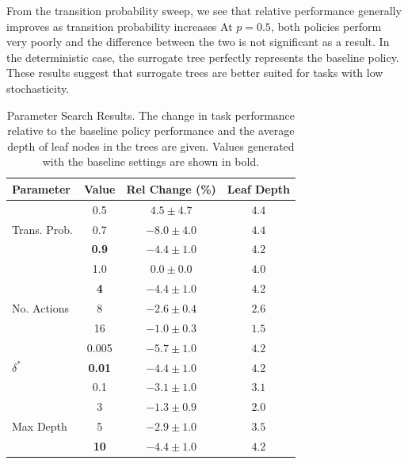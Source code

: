 \documentclass[letterpaper]{article} %
\begin{document}
From the transition probability sweep, we see that relative performance generally improves as transition probability increases
At $p=0.5$, both policies perform very poorly and the difference between the two is not significant as a result.
In the deterministic case, the surrogate tree perfectly represents the baseline policy.
These results suggest that surrogate trees are better suited for tasks with low stochasticity.
\begin{table}[t]
    \centering
    \begin{tabular}{@{}l c c c@{}}
        \toprule
        Parameter & Value & Rel Change (\%) & Leaf Depth \\
        \midrule
        \multirow[c]{3}{*}{Trans. Prob.} & 0.5 & $4.5 \pm 4.7$ & $4.4$ \\
        & 0.7 & $-8.0 \pm 4.0$ & $4.4$ \\
        & \textbf{0.9} & $\mathbf{-4.4 \pm 1.0}$ & $\mathbf{4.2}$ \\
        & 1.0 & $0.0 \pm 0.0$ & $4.0$ \\
        \midrule
        \multirow[c]{3}{*}{No. Actions} & \textbf{4} & $\mathbf{-4.4 \pm 1.0}$ & $\mathbf{4.2}$ \\
        & 8 & $-2.6 \pm 0.4$ & $2.6$ \\
        & 16 & $-1.0 \pm 0.3$ & $1.5$ \\
        \midrule
        \multirow[c]{3}{*}{$\delta^*$} & 0.005 & $-5.7 \pm 1.0$ & $4.2$ \\
        & \textbf{0.01} & $\mathbf{-4.4 \pm 1.0}$ & $\mathbf{4.2}$ \\
        & 0.1 & $-3.1 \pm 1.0$ & $3.1$ \\
        \midrule
        \multirow[c]{3}{*}{Max Depth} & 3 & $-1.3 \pm 0.9$ & $2.0$ \\
        & 5 & $-2.9 \pm 1.0$ & $3.5$ \\
        & \textbf{10} & $\mathbf{-4.4 \pm 1.0}$ & $\mathbf{4.2}$ \\
        \bottomrule
    \end{tabular}
    \caption{Parameter Search Results. The change in task performance relative to the baseline policy performance and the average depth of leaf nodes in the trees are given. Values generated with the baseline settings are shown in bold.}
    \label{tab: grid results}
\end{table}
\end{document}
